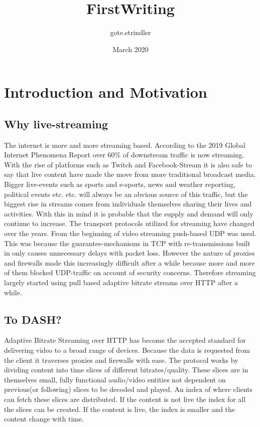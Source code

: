 \documentclass{article}
\title{FirstWriting}
\author{gote.strindler }
\date{March 2020}
\begin{document}
\maketitle

\section{Introduction and Motivation}

\subsection{Why live-streaming}

The internet is more and more streaming based. According to the 2019 Global Internet Phenomena Report over 60\% of downstream traffic is now streaming. With the rise of platforms such as Twitch and Facebook-Stream it is also safe to say that live content have made the move from more traditional broadcast media. Bigger live-events such as sports and e-sports, news and weather reporting, political events etc. etc. will always be an obvious source of this traffic, but the biggest rise in streams comes from individuals themselves sharing their lives and activities. With this in mind it is probable that the supply and demand will only continue to increase. The transport protocols utilized for streaming have changed over the years. From the beginning of video streaming push-based UDP was used. This was because the guarantee-mechanisms in TCP with re-transmissions built in only causes unnecessary delays with packet loss. However the nature of proxies and firewalls made this increasingly difficult after a while because more and more of them blocked UDP-traffic on account of security concerns. Therefore streaming largely started using pull based adaptive bitrate streams over HTTP after a while. 

\subsection{To DASH?}
Adaptive Bitrate Streaming over HTTP has become the accepted standard for delivering video to a broad range of devices. Because the data is requested from the client it traverses proxies and firewalls with ease. The protocol works by dividing content into time slices of different bitrates/quality. These slices are in themselves small, fully functional audio/video entities not dependent on previous(or following) slices to be decoded and played. An index of where clients can fetch these slices are distributed. If the content is not live the index for all the slices can be created. If the content is live, the index is smaller and the content change with time. 
\end{document}
